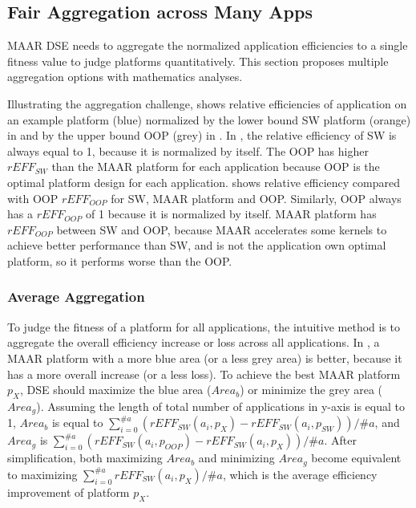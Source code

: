 \vspace{-2pt}
\subsection{Fair Aggregation across Many Apps}
\label{subsec:aggregation}

MAAR DSE needs to aggregate the normalized application efficiencies to a single fitness value to judge platforms quantitatively. This section proposes multiple aggregation options with mathematics analyses.

Illustrating the aggregation challenge,  shows relative efficiencies of application on an example platform (blue) normalized by the lower bound SW platform (orange) in  and by the upper bound OOP (grey) in . In , the relative efficiency of SW is always equal to 1, because it is normalized by itself. The OOP has higher $rEFF_{SW}$ than the MAAR platform for each application because OOP is the optimal platform design for each application.  shows relative efficiency compared with OOP $rEFF_{OOP}$ for SW, MAAR platform and OOP. Similarly, OOP always has a $rEFF_{OOP}$ of 1 because it is normalized by itself. MAAR platform has $rEFF_{OOP}$ between SW and OOP, because MAAR accelerates some kernels to achieve better performance than SW, and is not the application own optimal platform, so it performs worse than the OOP.



\subsubsection{Average Aggregation}

To judge the fitness of a platform for all applications, the intuitive method is to aggregate the overall efficiency increase or loss across all applications.
In , a MAAR platform with a more blue area (or a less grey area) is better, because it has a more overall increase (or a less loss). 
To achieve the best MAAR platform $p_{X}$, DSE should maximize the blue area ($Area_{b}$) or minimize the grey area ($Area_{g}$). 
Assuming the length of total number of applications in y-axis is equal to 1, 
$Area_{b}$ is equal to $\sum_{i=0}^{\#a} ( rEFF_{SW}(a_{i}, p_{X}) -  rEFF_{SW}(a_{i}, p_{SW}) ) / \#a $, and $Area_{g}$ is $\sum_{i=0}^{\#a} ( rEFF_{SW}(a_{i}, p_{OOP}) -  rEFF_{SW}(a_{i}, p_{X}) ) / \#a $.
After simplification, both maximizing $Area_b$ and minimizing $Area_g$ become equivalent to maximizing $\sum_{i=0}^{\#a} rEFF_{SW}(a_{i}, p_{X}) / \#a$, which is the average efficiency improvement of platform $p_{X}$.  

